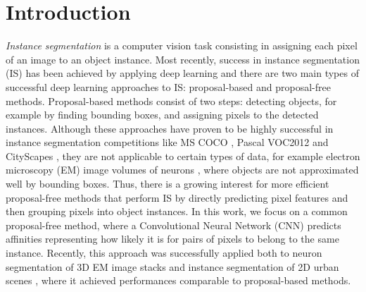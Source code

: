 
\section{Introduction}

\emph{Instance segmentation} is a computer vision task consisting in assigning each pixel of an image to an object instance. %
Most recently, success in instance segmentation (IS) has been achieved by applying deep learning and there are two main types of successful deep learning approaches to IS: proposal-based \cite{he2017mask,dai2016instance,li2017fully} and proposal-free \cite{kong2018recurrent,novotny2018semi,kulikov2018instance,kirillov2017instancecut} methods. Proposal-based methods consist of two steps: detecting objects, for example by finding bounding boxes, and assigning pixels to the detected instances. Although these approaches have proven to be highly successful in instance segmentation competitions like MS COCO \cite{lin2014microsoft}, Pascal VOC2012 \cite{everingham2010pascal} and CityScapes \cite{cordts2016cityscapes}, they are not applicable to certain types of data, for example electron microscopy (EM) image volumes of neurons \cite{arganda2015crowdsourcing}, where objects are not approximated well by bounding boxes. 
Thus, there is a growing interest for more efficient proposal-free methods that perform IS by directly predicting pixel features and then grouping pixels into object instances. In this work, we focus on a common proposal-free method, where a Convolutional Neural Network (CNN) predicts affinities representing how likely it is for pairs of pixels to belong to the same instance. Recently, this approach was successfully applied both to neuron segmentation of 3D EM image stacks \cite{lee2017superhuman,wolf2018mutex} and instance segmentation of 2D urban scenes \cite{liu2018affinity}, where it achieved performances comparable to proposal-based methods.

